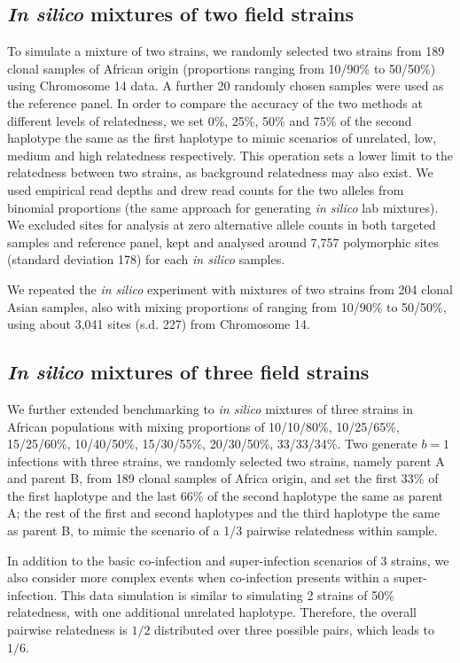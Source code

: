 \documentclass[9pt,lineno]{elife}
\begin{document}
\begin{appendixbox}
\subsection{{\it In silico} mixtures of two field strains}
To simulate a mixture of two strains, we randomly selected two strains from 189 clonal samples of African origin (proportions ranging from 10/90\% to 50/50\%) using Chromosome 14 data.  A further 20 randomly chosen samples were used as the reference panel. In order to compare the accuracy of the two methods at different levels of relatedness, we set 0\%, 25\%, 50\% and 75\% of the second haplotype the same as the first haplotype to mimic scenarios of unrelated, low, medium and high relatedness respectively. This operation sets a lower limit to the relatedness between two strains, as background relatedness may also exist. We used empirical read depths and drew read counts for the two alleles from binomial proportions (the same approach for generating {\it in silico} lab mixtures). We excluded sites for analysis at zero alternative allele counts in both targeted samples and reference panel, kept and analysed around 7,757 polymorphic sites (standard deviation 178) for each {\it in silico} samples.

We repeated the \emph{in silico} experiment with mixtures of two strains from 204 clonal Asian samples, also with mixing proportions of ranging from 10/90\% to 50/50\%, using about 3,041 sites (s.d. 227) from Chromosome 14.

\subsection{{\it In silico} mixtures of three field strains}
We further extended benchmarking to \emph{in silico} mixtures of three strains in African populations with mixing proportions of 10/10/80\%, 10/25/65\%, 15/25/60\%, 10/40/50\%, 15/30/55\%, 20/30/50\%, 33/33/34\%. Two generate $b=1$ infections with three strains, we randomly selected two strains, namely parent A and parent B, from 189 clonal samples of Africa origin, and set the first 33\% of the first haplotype and the last 66\% of the second haplotype the same as parent A; the rest of the first and second haplotypes and the third haplotype the same as parent B, to mimic the scenario of a 1/3 pairwise relatedness within sample.

In addition to the basic co-infection and super-infection scenarios of 3 strains, we also consider more complex events when co-infection presents within a super-infection. This data simulation is similar to simulating 2 strains of 50\% relatedness, with one additional unrelated haplotype. Therefore, the overall pairwise relatedness is $1/2$ distributed over three possible pairs, which leads to $1/6$.


\end{appendixbox}
\end{document}
